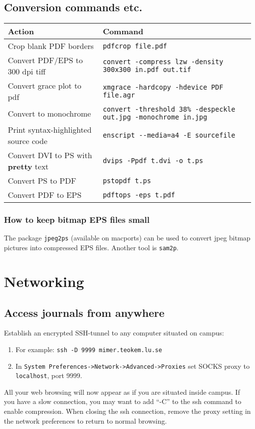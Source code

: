 \documentclass[a4paper,10pt]{article}
\begin{document}
\subsection{Conversion commands etc.}
\begin{table}[h!]
\center
\begin{small}
\begin{tabular}{ll}\hline\hline
Action              & Command \\\hline
Crop blank PDF borders & \verb"pdfcrop file.pdf" \\
Convert PDF/EPS to 300 dpi tiff & \verb"convert -compress lzw -density 300x300 in.pdf out.tif" \\
Convert grace plot to pdf       & \verb"xmgrace -hardcopy -hdevice PDF file.agr"\\
Convert to monochrome           & \verb"convert -threshold 38% -despeckle out.jpg -monochrome in.jpg"\\
Print syntax-highlighted source code & \verb"enscript --media=a4 -E sourcefile"\\
Convert DVI to PS with \textbf{pretty} text & \verb"dvips -Ppdf t.dvi -o t.ps"\\
Convert PS to PDF                           & \verb"pstopdf t.ps"\\
Convert PDF to EPS                          & \verb"pdftops -eps t.pdf"\\
\hline
\end{tabular}\end{small}\end{table}

\subsubsection{How to keep bitmap EPS files small}
The package \verb"jpeg2ps" (available on macports) can be used to convert jpeg bitmap pictures into compressed EPS files. Another tool is \verb"sam2p".



\section{Networking}
\subsection{\label{sec:proxy}Access journals from anywhere}
Establish an encrypted SSH-tunnel to any computer situated on campus:
\begin{enumerate}
\item For example: \verb+ssh -D 9999 mimer.teokem.lu.se+
\item In \verb+System Preferences->Network->Advanced->Proxies+ set SOCKS proxy to \verb+localhost+, port 9999.
\end{enumerate}
All your web browsing will now appear as if you are situated inside campus. If you have a slow connection, you may want to add ``-C'' to the ssh command to enable compression.  When closing the ssh connection, remove the proxy setting in the network preferences to return to normal browsing.
\end{document}
